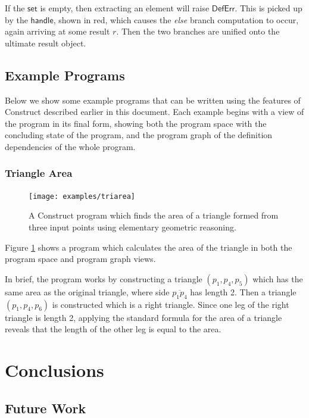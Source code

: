 \documentclass[twoside,openright,11pt]{report}
\begin{document}
If the $\mathsf{set}$ is empty, then extracting an element will raise $\mathsf{DefErr}$. 
This is picked up by the $\mathsf{handle}$, shown in red, which causes the {\it else} branch computation to occur, again arriving at some result $r$.
Then the two branches are unified onto the ultimate result object.

\section{Example Programs}
\label{sec:example}

Below we show some example programs that can be written using the features of Construct described earlier in this document. 
Each example begins with a view of the program in its final form, showing both the program space with the concluding state of the program, and the program graph of the definition dependencies of the whole program.

\pagebreak

\subsection{Triangle Area}
\label{subsec:triarea}

\begin{figure}[h]
  \centering
  \texttt{[image: examples/triarea]}
  \caption{A Construct program which finds the area of a triangle formed from three input points using elementary geometric reasoning.}
  \label{fig:triarea}
\end{figure}

Figure \ref{fig:triarea} shows a program which calculates the area of the triangle in both the program space and program graph views.

In brief, the program works by constructing a triangle $(p_1,p_4,p_5)$ which has the same area as the original triangle, where side $\overline{p_1p_4}$ has length 2.
Then a triangle $(p_1,p_4,p_6)$ is constructed which is a right triangle. 
Since one leg of the right triangle is length 2, applying the standard formula for the area of a triangle reveals that the length of the other leg is equal to the area.

\chapter{Conclusions}
\label{chap:conclusions}

\section{Future Work}
\label{sec:future}
\end{document}
